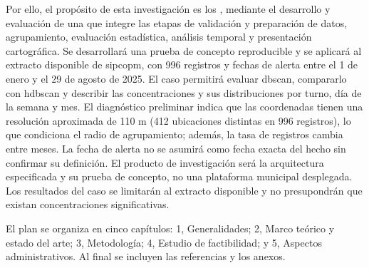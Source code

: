 Por ello, el propósito de esta investigación es  los , mediante el desarrollo y evaluación de una  que integre las etapas de validación y preparación de datos, agrupamiento, evaluación estadística, análisis temporal y presentación cartográfica. Se desarrollará una prueba de concepto reproducible y se aplicará al extracto disponible de \gls{sipcopm}, con 996 registros y fechas de alerta entre el 1 de enero y el 29 de agosto de 2025. El caso permitirá evaluar \gls{dbscan}, compararlo con \gls{hdbscan} y describir las concentraciones y sus distribuciones por turno, día de la semana y mes. El diagnóstico preliminar indica que las coordenadas tienen una resolución aproximada de 110 m (412 ubicaciones distintas en 996 registros), lo que condiciona el radio de agrupamiento; además, la tasa de registros cambia entre meses. La fecha de alerta no se asumirá como fecha exacta del hecho sin confirmar su definición. El producto de investigación será la arquitectura especificada y su prueba de concepto, no una plataforma municipal desplegada. Los resultados del caso se limitarán al extracto disponible y no presupondrán que existan concentraciones significativas.

El plan se organiza en cinco capítulos: 1, Generalidades; 2, Marco teórico y estado del arte; 3, Metodología; 4, Estudio de factibilidad; y 5, Aspectos administrativos. Al final se incluyen las referencias y los anexos.

\clearpage
